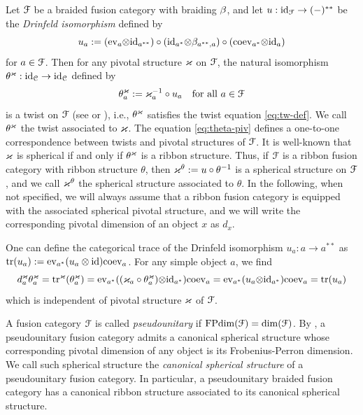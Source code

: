 \documentclass[11pt]{article}
\begin{document}
 Let ${\mathcal{F}}$ be a braided fusion category with braiding ${\beta}$, and let $u: {\operatorname{id}}_{{\mathcal{F}}} \rightarrow (-)^{**}$ be the \emph{Drinfeld isomorphism} defined by
\[u_a := ({\operatorname{ev}}_{a} {\otimes} {\operatorname{id}}_{a^{**}})\circ ({\operatorname{id}}_{a^*} {\otimes} {\beta}_{a^{**}, a})\circ ({\operatorname{coev}}_{a^*} {\otimes} {\operatorname{id}}_a)\]
for $a \in {\mathcal{F}}$. Then for any pivotal structure $\varkappa$ on ${\mathcal{F}}$, the natural isomorphism $\theta^{\varkappa}: {\operatorname{id}}_{\mathcal{C}} \rightarrow {\operatorname{id}}_{\mathcal{C}}$ defined by 
\begin{equation}\label{eq:theta-piv}
\theta^{\varkappa}_a := \varkappa_{a}^{-1}\circ u_a \quad\text{for all $a \in {\mathcal{F}}$}
\end{equation}
is a twist on ${\mathcal{F}}$ (see \cite[Def.~8.10.1]{EGNO} or \cite[p.38]{NS07}), i.e., $\theta^\varkappa$ satisfies the twist equation \eqref{eq:tw-def}. We call $\theta^{\varkappa}$ the twist associated to $\varkappa$. The equation \eqref{eq:theta-piv} defines a one-to-one correspondence between twists and pivotal structures of ${\mathcal{F}}$. It is well-known that $\varkappa$ is spherical if and only if  $\theta^{\varkappa}$ is a ribbon structure. Thus, if ${\mathcal{F}}$ is a ribbon fusion category with ribbon structure $\theta$, then $\varkappa^{\theta} := u \circ \theta^{-1}$ is a spherical structure on ${\mathcal{F}}$, and we call $\varkappa^{\theta}$ the spherical structure associated to $\theta$. In the following, when not specified, we will always assume that a ribbon fusion category is equipped with the associated spherical pivotal structure, and we will write the corresponding pivotal dimension of an object $x$  as $d_x$. 

One can define the categorical trace of the Drinfeld isomorphism $u_a : a \to a^{**}$ as ${\operatorname{tr}}(u_a) := {\operatorname{ev}}_{a^*}(u_a \otimes {\operatorname{id}}){\operatorname{coev}}_a$. For any simple object $a$, we find
\begin{equation}\label{eq:tr_drin}
d^{\varkappa}_a \theta^{\varkappa}_{a} = {\operatorname{tr}}^{\varkappa}(\theta^{\varkappa}_{a}) 
= {\operatorname{ev}}_{a^*}  ((\varkappa_{a} \circ \theta^{\varkappa}_a) {\otimes}{\operatorname{id}}_{a^*}) {\operatorname{coev}}_{a}
= {\operatorname{ev}}_{a^*} (u_a {\otimes}{\operatorname{id}}_{a^*})  {\operatorname{coev}}_{a} ={\operatorname{tr}}(u_a)
\end{equation}
which is independent of pivotal structure $\varkappa$ of ${\mathcal{F}}$. 

A fusion category ${\mathcal{F}}$ is called \emph{pseudounitary} if $\operatorname{FPdim}({\mathcal{F}}) = \dim({\mathcal{F}})$. By \cite[Prop.\ 8.23]{ENO05}, a pseudounitary fusion category admits a canonical spherical structure whose corresponding pivotal dimension of any object is its Frobenius-Perron dimension. We call such spherical structure the \emph{canonical spherical structure} of a pseudounitary fusion category.  In particular, a pseudounitary braided fusion category has a canonical ribbon structure associated to its canonical spherical structure.
\end{document}
